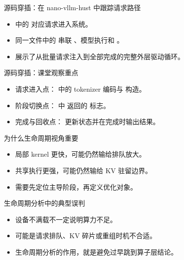 \begin{frame}{源码穿插：在 nano-vllm-hust 中跟踪请求路径}
  \begin{itemize}
    \item \texttt{} 中的 \texttt{} 对应请求进入系统。
    \item 同一文件中的 \texttt{} 串联 \texttt{}、模型执行和 \texttt{}。
    \item \texttt{} 展示了从批量请求注入到全部完成的完整外层驱动循环。
  \end{itemize}
\end{frame}

\begin{frame}{源码穿插：课堂观察重点}
  \begin{itemize}
    \item 请求进入点：\texttt{} 中的 tokenizer 编码与 \texttt{} 构造。
    \item 阶段切换点：\texttt{} 中 \texttt{} 返回的 \texttt{} 标志。
    \item 完成与回收点：\texttt{} 更新状态并在完成时输出结果。
  \end{itemize}
\end{frame}

\begin{frame}{为什么生命周期视角重要}
  \begin{itemize}
    \item 局部 kernel 更快，可能仍然输给排队放大。
    \item 共享执行更强，可能仍然输给 KV 驻留边界。
    \item 需要先定位主导阶段，再定义优化对象。
  \end{itemize}
\end{frame}

\begin{frame}{生命周期分析中的典型误判}
  \begin{itemize}
    \item 设备不满载不一定说明算力不足。
    \item 可能是请求排队、KV 碎片或重组时机不合适。
    \item 生命周期分析的作用，就是避免过早跳到算子层结论。
  \end{itemize}
\end{frame}

